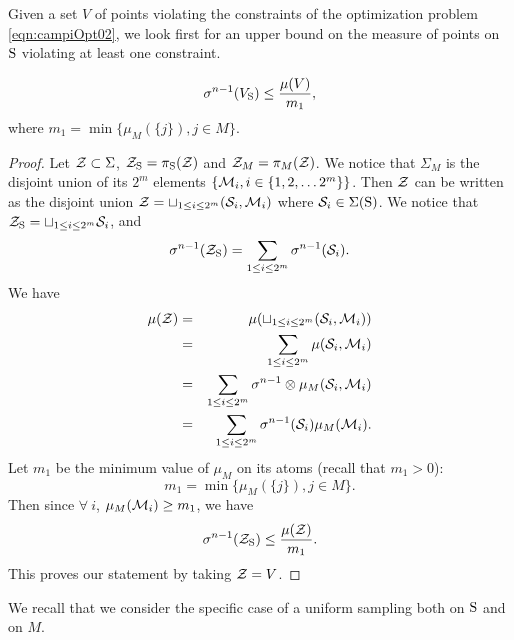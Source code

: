 
Given a set $V$ of points violating the constraints of the optimization problem \eqref{eqn:campiOpt02}, we look first for an upper bound on the measure of points on $\text{S}$ violating at least one constraint.

\begin{lemma}$$\sigma^{n-1}(V_{\text{S}}) \leq \frac{\mu(V)}{m_1},$$ where $m_1 = \min \{\mu_M(\{j\}), j \in M\}$.\end{lemma}
\begin{proof}

Let $\mathcal{Z} \subset \Sigma$, $\mathcal{Z}_{\text{S}} = \pi_{\text{S}} (\mathcal{Z})$ and $\mathcal{Z}_M = \pi_M (\mathcal{Z})$. We notice that $\Sigma_M$ is the disjoint union of its $2^m$ elements $\{\mathcal{M}_i, i \in \{1,2, \ldots 2^m\} \}$. Then $\mathcal{Z}$ can be written as the disjoint union $\mathcal{Z} = \sqcup_{1 \leq i \leq 2^m} (\mathcal{S}_i, \mathcal{M}_i)$ where $\mathcal{S}_i \in \Sigma(\text{S})$. We notice that 
$\mathcal{Z}_{\text{S}} = \sqcup_{1 \leq i \leq 2^m} \mathcal{S}_i$, 
and
\begin{equation*}
\sigma^{n-1} (\mathcal{Z}_{\text{S}}) = \sum_{1 \leq i \leq 2^m} \sigma^{n-1} (\mathcal{S}_i).
\end{equation*}
We have 
\begin{eqnarray*}
\mu(\mathcal{Z}) &=& \mu(\sqcup_{1 \leq i \leq 2^m} (\mathcal{S}_i, \mathcal{M}_i)) \\
&=& \sum_{1 \leq i \leq 2^m} \mu(\mathcal{S}_i, \mathcal{M}_i) \\
 &=& \sum_{1 \leq i \leq 2^m} \sigma^{n-1} \otimes \mu_M (\mathcal{S}_i, \mathcal{M}_i) \\
 & = &\sum_{1 \leq i \leq 2^m} \sigma^{n-1}(\mathcal{S}_i) \mu_M (\mathcal{M}_i).
\end{eqnarray*}
Let $m_1$ be the minimum value  of $\mu_M$ on its atoms (recall that $m_1 > 0$):
$$m_1 = \min \{\mu_M(\{j\}), j \in M\}.$$ Then since $ \forall \ i$, $\mu_M(\mathcal{M}_i) \geq m_1$, we have
\begin{equation}
\sigma^{n-1}(\mathcal{Z}_{\text{S}}) \leq \frac{\mu(\mathcal{Z})}{m_1}.
\end{equation}
This proves our statement by taking $\mathcal{Z} = V$.
\end{proof}

We recall that we consider the specific case of a uniform sampling both on $\text{S}$ and on $M$. 

